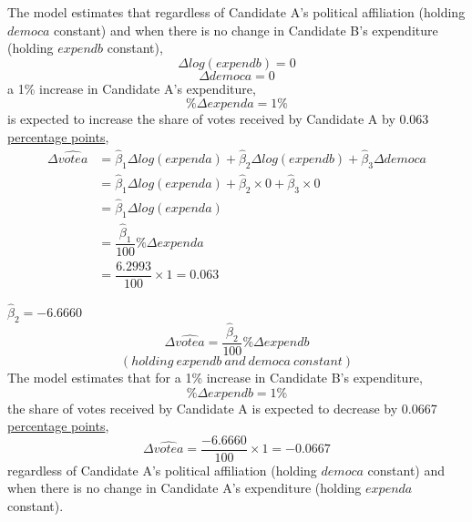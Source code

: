 \documentclass[12pt]{report}
\begin{document}
\noindent The model estimates that regardless of Candidate A’s political affiliation (holding $democa$ constant) and when there is no change in Candidate B’s expenditure (holding $expendb$ constant), $$\Delta log(expendb) = 0$$ $$\Delta democa = 0$$ a 1\% increase in Candidate A’s expenditure,
$$\%{\Delta}expenda = 1\%$$ is expected to increase the share of votes received by Candidate A  by 0.063 \uline{percentage points},
\begin{align*}
\Delta \widehat{votea} &= \hat{\beta}_1\Delta log(expenda) + \hat{\beta}_2\Delta log(expendb) + \hat{\beta}_3\Delta democa \\
&= \hat{\beta}_1\Delta log(expenda) + \hat{\beta}_2\times 0 + \hat{\beta}_3\times 0 \\
&= \hat{\beta}_1\Delta log(expenda) \\
&= \dfrac{\hat{\beta}_1}{100}\%{\Delta}expenda \\
&= \dfrac{6.2993}{100}\times1=0.063
\end{align*}


\vspace{10mm}
\noindent $\hat{\beta}_2 = -6.6660$
$${\Delta}\widehat{votea} = \dfrac{\hat{\beta}_2}{100}\%{\Delta}expendb$$
$$(holding\ expendb\ and\ democa\ constant)$$
The model estimates that for a 1\% increase in Candidate B’s expenditure,
$$\%{\Delta}expendb = 1\%$$
the share of votes received by Candidate A is expected to decrease by 0.0667 \uline{percentage points},
$${\Delta}\widehat{votea} = \dfrac{-6.6660}{100}\times1=-0.0667$$
regardless of Candidate A’s political affiliation (holding $democa$ constant) and when there is no change in Candidate A’s expenditure (holding $expenda$ constant).
\end{document}
